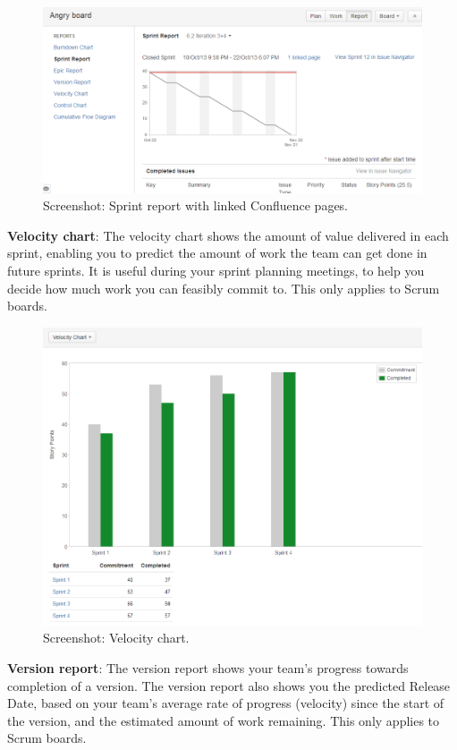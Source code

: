 \begin{figure}[h]
	\centering
	\includegraphics[scale=0.4]{img/sprintreport-linkedpages.png}
	\caption{Screenshot: Sprint report with linked Confluence pages.} 
	\label{fig:sprintreport-linkedpages}
\end{figure}

\textbf{Velocity chart}: The velocity chart shows the amount of value delivered in each sprint, enabling you to predict the amount of work the team can get done in future sprints. It is useful during your sprint planning meetings, to help you decide how much work you can feasibly commit to. This only applies to Scrum boards.

\begin{figure}[h]
	\centering
	\includegraphics[scale=0.4]{img/velocity-chart.png}
	\caption{Screenshot: Velocity chart.} 
	\label{fig:velocity-chart}
\end{figure}

\textbf{Version report}: The version report shows your team's progress towards completion of a version. The version report also shows you the predicted Release Date, based on your team's average rate of progress (velocity) since the start of the version, and the estimated amount of work remaining. This only applies to Scrum boards.

